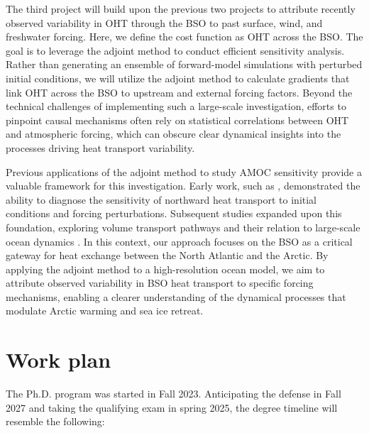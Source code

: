 \documentclass[draft]{agujournal2019}
\begin{document}
The third project will build upon the previous two projects to attribute recently observed variability in OHT through the BSO to past surface, wind, and freshwater forcing. Here, we define the cost function as OHT across the BSO. The goal is to leverage the adjoint method to conduct efficient sensitivity analysis. Rather than generating an ensemble of forward-model simulations with perturbed initial conditions, we will utilize the adjoint method to calculate gradients that link OHT across the BSO to upstream and external forcing factors. Beyond the technical challenges of implementing such a large-scale investigation, efforts to pinpoint causal mechanisms often rely on statistical correlations between OHT and atmospheric forcing, which can obscure clear dynamical insights into the processes driving heat transport variability.

Previous applications of the adjoint method to study AMOC sensitivity provide a valuable framework for this investigation. Early work, such as , demonstrated the ability to diagnose the sensitivity of northward heat transport to initial conditions and forcing perturbations. Subsequent studies expanded upon this foundation, exploring volume transport pathways and their relation to large-scale ocean dynamics \cite{marotzke1999, bugnion2006, czeschel2010, pillar2016}. In this context, our approach focuses on the BSO as a critical gateway for heat exchange between the North Atlantic and the Arctic. By applying the adjoint method to a high-resolution ocean model, we aim to attribute observed variability in BSO heat transport to specific forcing mechanisms, enabling a clearer understanding of the dynamical processes that modulate Arctic warming and sea ice retreat.



\section{Work plan}
    The Ph.D. program was started in Fall 2023. Anticipating the defense in Fall 2027 and taking the qualifying exam in spring 2025, the degree timeline will resemble the following:
\end{document}
